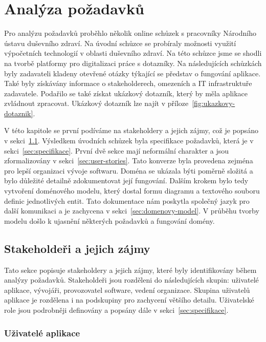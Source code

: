 \chapter{Analýza požadavků}\label{ch:analyza-pozadavku}

Pro analýzu požadavků proběhlo několik online schůzek s pracovníky Národního ústavu duševního zdraví.
Na úvodní schůzce se probíraly možnosti využití výpočetních technologií v oblasti duševního zdraví.
Na této schůzce jsme se shodli na tvorbě platformy pro digitalizaci práce s dotazníky.
Na následujících schůzkách byly zadavateli kladeny otevřené otázky týkající se představ o fungování aplikace.
Také byly získávány informace o stakeholderech, omezeních a IT infrastruktuře zadavatele.
Podařilo se také získat ukázkový dotazník, který by měla aplikace zvládnout zpracovat.
Ukázkový dotazník lze najít v příloze~\ref{fig:ukazkovy-dotaznik}.

V této kapitole se první podíváme na stakeholdery a jejich zájmy, což je popsáno v sekci~\ref{sec:stakeholderi}.
Výsledkem úvodních schůzek byla specifikace požadavků, která je v sekci~\ref{sec:specifikace}.
První dvě sekce mají neformální charakter a jsou zformalizovány v sekci~\ref{sec:user-stories}.
Tato konverze byla provedena zejména pro lepší organizaci vývoje softwaru.
Doména se ukázala býti poměrně složitá a bylo důležité detailně zdokumentovat její fungování.
Dalším krokem bylo tedy vytvoření doménového modelu, který dostal formu diagramu a textového souboru definic jednotlivých entit.
Tato dokumentace nám poskytla společný jazyk pro další komunikaci a je zachycena v sekci~\ref{sec:domenovy-model}.
V průběhu tvorby modelu došlo k ujasnění některých požadavků a fungování domény.


\section{Stakeholdeři a jejich zájmy}\label{sec:stakeholderi}

Tato sekce popisuje stakeholdery a jejich zájmy, které byly identifikovány během analýzy požadavků.
Stakeholdeři jsou rozděleni do následujících skupin: uživatelé aplikace, vývojáři, provozovatel software, vedení organizace.
Skupina uživatelů aplikace je rozdělena i na podskupiny pro zachycení většího detailu.
Uživatelské role jsou podrobněji definovány a popsány dále v sekci~\ref{sec:specifikace}.

\subsection*{Uživatelé aplikace}\label{subsec:uzivatele-aplikace}

